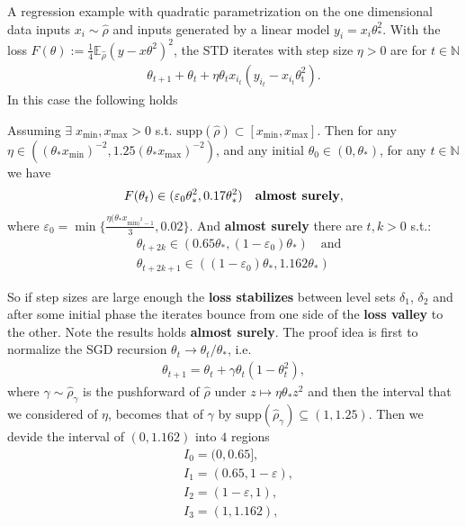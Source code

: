 A regression example with quadratic parametrization on the one dimensional
data inputs $x_i \sim \hat{\rho}$ and inputs generated by a linear model $y_i
= x_i\theta_{*}^{2}$. With the loss $F(\theta) := \frac{1}{4}
\mathbb{E}_{\hat{\rho}}(y - x\theta^{2})^{2}$, the STD iterates with step
size $\eta>0$ are for $ t \in \mathbb{N}$
\begin{align}
    \theta_{t+1} + \theta_t + \eta \theta_t x_{i_t}(y_{i_t} -
    x_{i_t}\theta_\text{t}^{2}).
\end{align}
In this case the following holds
\begin{proposition}
    \label{prop: loss-stab}
    Assuming $\exists\; x_{\text{min}}, x_{\text{max}} > 0$ s.t.
    $\text{supp}(\hat{\rho}) \subset [x_{\text{min}}, x_{\text{max}}]$. Then
    for any $\eta \in ((\theta_*x_{\text{min}})^{-2},
    1.25(\theta_*x_{\text{max}})^{-2})$, and any initial $\theta_0 \in (0,
    \theta_*)$, for any $t \in \mathbb{N}$ we have
    \begin{align}
        F(\theta_t) \in (\varepsilon_0\theta_*^{2}, 0.17\theta_*^{2}) \quad
        \text{\textbf{almost surely}},
    \end{align}
    where $\varepsilon_0 = \min \{\frac{\eta(\theta_* x_{\text{min})^{2}-
    1}}{3}, 0.02\}$. And \textbf{almost surely} there are $t, k > 0 $ s.t.:
    \begin{align}
        &\theta_{t+2k} \in (0.65\theta_*, (1-\varepsilon_0)\theta_*) \quad
        \text{and}\\
        &\theta_{t+2k+1} \in ((1-\varepsilon_0)\theta_*, 1.162\theta_*)
    \end{align}
\end{proposition}
So if step sizes are large enough the \textbf{loss stabilizes} between level
sets $\delta_1$, $\delta _2$ and after some initial phase the iterates bounce
from one side of the \textbf{loss valley} to the other. Note the results
holds \textbf{almost surely}. The proof idea is first to normalize the SGD
recursion $\theta_t \to \theta_t / \theta_*$, i.e.
\begin{align}
    \theta_{t+1} = \theta_t + \gamma\theta_t\left(
    1-\theta_t^{2} \right),
\end{align}
where $\gamma \sim \hat{\rho}_\gamma$ is the pushforward of $\hat{\rho}$
under $z \mapsto \eta \theta_* z^{2}$ and then the interval that we
considered of $\eta$, becomes that of $\gamma$ by
$\text{supp}(\hat{\rho}_\gamma) \subseteq (1, 1.25)$. Then we devide the
interval of $(0, 1.162)$ into $4$ regions
\begin{align}
    &I_0 = (0, 0.65],\\
    &I_1 = (0.65, 1-\varepsilon),\\
    &I_2 = (1-\varepsilon, 1),\\
    &I_3 = (1, 1.162),
\end{align}

